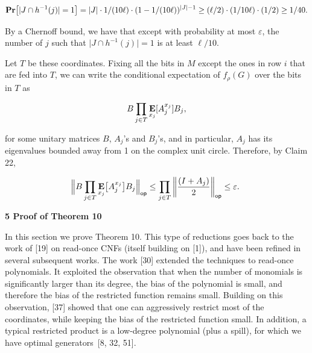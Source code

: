 \[\begin{gathered}
\mathop{\bf Pr\/}\bigl{[}\lvert J\cap h^{-1}(j)\rvert=1\bigr{]}=\lvert J\rvert\cdot 1/(10\ell)\cdot(1-1/(10\ell))^{\lvert J\rvert-1}\geq(\ell/2)\cdot(1/10\ell)\cdot(1/2)\geq 1/40.
\end{gathered}\]


By a Chernoff bound, we have that except with probability at most $\varepsilon$, the number of $j$ such that $\lvert J\cap h^{-1}(j)\rvert=1$ is at least $\ell/10$.\par




Let $T$ be these coordinates.
Fixing all the bits in $M$ except the ones in row $i$ that are fed into $T$, we can write the conditional expectation of $f_{\rho}(G)$ over the bits in $T$ as\par


\[\begin{gathered}
B\prod_{j\in T}\mathop{\bf E\/}_{x_{j}}[A_{j}^{x_{j}}]B_{j},
\end{gathered}\]


for some unitary matrices $B$, $A_{j}$’s and $B_{j}$’s, and in particular, $A_{j}$ has its eigenvalues bounded away from 1 on the complex unit circle.
Therefore, by Claim 22,\par


\[\begin{gathered}
\Big{\lVert}B\prod_{j\in T}\mathop{\bf E\/}_{x_{j}}\bigl{[}A_{j}^{x_{j}}\bigr{]}B_{j}\Big{\rVert}_{\mathsf{op}}\leq\prod_{j\in T}\bigg{\lVert}\frac{(I+A_{j})}{2}\bigg{\rVert}_{\mathsf{op}}\leq\varepsilon.\
\end{gathered}\]






\par\medskip\noindent\textbf{
5 Proof of Theorem 10
}\par




In this section we prove Theorem 10. This type of reductions goes back to the work of [19] on read-once CNFs (itself building on [1]), and have been refined in several subsequent works. The work [30] extended the techniques to read-once polynomials. It exploited the observation that when the number of monomials is significantly larger than its degree, the bias of the polynomial is small, and therefore the bias of the restricted function remains small.
Building on this observation, [37] showed that one can aggressively restrict most of the coordinates, while keeping the bias of the restricted function small.
In addition, a typical restricted product is a low-degree polynomial (plus a spill), for which we have optimal generators [8, 32, 51].\par




